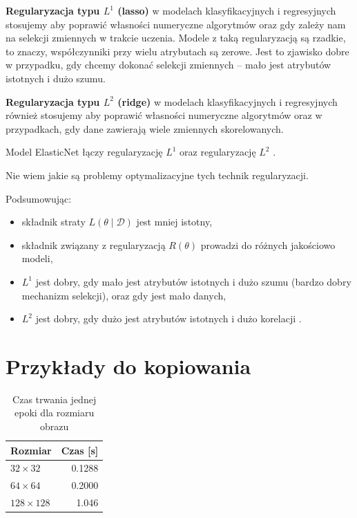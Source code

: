 \documentclass[wi]{zut}
\begin{document}
\textbf{Regularyzacja typu $L^1$ (lasso)} w modelach klasyfikacyjnych i regresyjnych stosujemy aby poprawić własności numeryczne algorytmów oraz gdy zależy nam na selekcji zmiennych w trakcie uczenia. Modele z taką regularyzacją są rzadkie, to znaczy, współczynniki przy wielu atrybutach są zerowe. Jest to zjawisko dobre w przypadku, gdy chcemy dokonać selekcji zmiennych -- mało jest atrybutów istotnych i dużo szumu.

\textbf{Regularyzacja typu $L^2$ (ridge)} w modelach klasyfikacyjnych i regresyjnych również stosujemy aby poprawić własności numeryczne algorytmów oraz w przypadkach, gdy dane zawierają wiele zmiennych skorelowanych.

Model ElasticNet łączy regularyzację $L^1$ oraz regularyzację $L^2$ \cite{wiki:Elastic_net_regularization}. 

Nie wiem jakie są problemy optymalizacyjne tych technik regularyzacji.
\question

Podsumowując:

\begin{itemize}
    \item składnik straty $L(\theta \mid \mathscr{D})$ jest mniej istotny,
    \item składnik związany z regularyzacją $R(\theta)$ prowadzi do różnych jakościowo modeli,
    \item $L^1$ jest dobry, gdy mało jest atrybutów istotnych i dużo szumu (bardzo dobry mechanizm selekcji), oraz gdy jest mało danych,
    \item $L^2$ jest dobry, gdy dużo jest atrybutów istotnych i dużo korelacji \cite{Korzen2020_12}.
\end{itemize}

\printbibliography[heading=bibintoc]

\appendix

\section{Przykłady do kopiowania}

\begin{table}[H]
\caption{Czas trwania jednej epoki dla rozmiaru obrazu}
\vspace{1em}
\centering
\begin{tabular}{@{}lr@{}}
\toprule
Rozmiar          & Czas {[}s{]} \\ \midrule
$32 \times 32$   & 0.1288       \\
$64 \times 64$   & 0.2000       \\
$128 \times 128$ & 1.046        \\ \bottomrule
\end{tabular}
\end{table}
\end{document}
